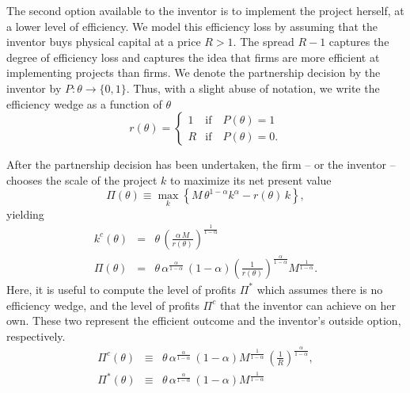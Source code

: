 \documentclass[12pt]{article}
\begin{document}
The second option available to the inventor is to  implement the project herself, at a lower level of efficiency. We model this efficiency loss by assuming that the inventor buys physical capital at a price $R>1$. The spread $R-1$ captures the degree of efficiency loss and captures the idea that firms are more efficient at implementing projects than firms. We   denote the partnership decision by the inventor by $P: \theta \rightarrow\{0,1\}$. Thus, with a slight abuse of notation, we write the efficiency wedge as a function of $\theta$
\begin{equation}\label{eqn:rr}
r(\theta) =
\left\{
\begin{array}{ll}
1 & \textrm{if} \quad P(\theta)=1\\
R & \textrm{if}  \quad P(\theta)=0.
\end{array}\right.
\end{equation}

After the partnership decision has been undertaken, the firm -- or the inventor -- chooses the scale of the project $k$ to maximize its net present value
\begin{equation}
\Pi(\theta) \equiv \max_k \left\{M\, \theta^{1-\alpha} k^\alpha- r(\theta) \, k \right\},
\end{equation}
yielding
\begin{eqnarray}
k^c(\theta) &=& \theta\, \left(\frac{\alpha\, M}{r(\theta)}\right)^{\frac{1}{1-\alpha}}  \\
\Pi(\theta) &=& \theta\, \alpha^{\frac{\alpha}{1-\alpha}}\,(1-\alpha)  \left(\frac{1}{r(\theta)}\right)^{\frac{\alpha}{1-\alpha}} M^{\frac{1}{1-\alpha}} \label{eqn:profits}.
\end{eqnarray}
Here, it is useful to compute the level of profits $\Pi^*$ which assumes there is no efficiency wedge, and the level of profits $\Pi^c$ that the inventor can achieve on her own. These two represent the efficient outcome and the inventor's outside option, respectively.
\begin{eqnarray}
\Pi^c(\theta) &\equiv& \theta\, \alpha^{\frac{\alpha}{1-\alpha}}\,(1-\alpha) M^{\frac{1}{1-\alpha}} \,  \left(\frac{1}{R}\right)^{\frac{\alpha}{1-\alpha}} \label{eqn:profits},\\
\Pi^*(\theta) &\equiv& \theta\, \alpha^{\frac{\alpha}{1-\alpha}}\,(1-\alpha) M^{\frac{1}{1-\alpha}}   \label{eqn:profitsFB}
\end{eqnarray}
\end{document}
